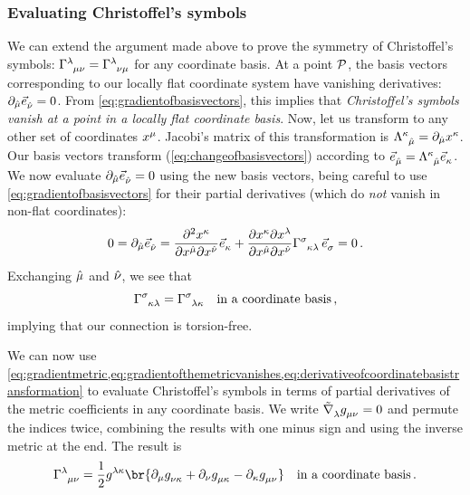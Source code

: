\subsubsection{Evaluating Christoffel's symbols}
%
 We can extend the argument made above to prove the symmetry of Christoffel's symbols: $\tchris\lambda\mu\nu=\tchris\lambda\nu\mu$ for any coordinate basis. At a point $\mathcal{P}$, the basis vectors corresponding to our locally flat coordinate system have vanishing derivatives: $\ipd{\ridx\mu}\tbvec{\ridx\nu} = 0$. From \cref{eq:gradientofbasisvectors}, this implies that \emph{Christoffel's symbols vanish at a point in a locally flat coordinate basis}. Now, let us transform to any other set of coordinates $\tvec\pos\mu$. Jacobi's matrix of this transformation is $\ttransmat{\kappa}{\ridx\mu} = \ipd{\ridx\mu}\tvec\pos\kappa$. Our basis vectors transform (\cref{eq:changeofbasisvectors}) according to $\tbvec{\ridx\mu} = \ttransmat\kappa{\ridx\mu}\tbvec\kappa$. We now evaluate $\ipd{\ridx\mu}\tbvec{\ridx\nu} = 0$ using the new basis vectors, being careful to use \cref{eq:gradientofbasisvectors} for their partial derivatives (which do \emph{not} vanish in non-flat coordinates):
%
\begin{equation}\label{eq:derivativeofcoordinatebasistransformation}
  0 = \ipd{\ridx\mu}\tbvec{\ridx\nu}
    = \dfrac{\partial^2\tvec\pos\kappa}{\partial\tvec\pos{\ridx\mu}\partial\tvec\pos{\ridx\nu}}\tbvec\kappa
      + \dfrac{\partial\tvec\pos\kappa\partial\tvec\pos\lambda}{\partial\tvec\pos{\ridx\mu}\partial\tvec\pos{\ridx\nu}}\tchris\sigma\kappa\lambda\,\tbvec\sigma 
    = 0\,.
\end{equation}
%
Exchanging $\hat{\mu}$ and $\hat{\nu}$, we see that
%
\begin{equation}\label{eq:connectionistorsionfree}
  \tchris\sigma\kappa\lambda = \tchris\sigma\lambda\kappa\quad\text{in a coordinate basis}\,,
\end{equation}
%
implying that our connection is torsion-free.

 We can now use \cref{eq:gradientmetric,eq:gradientofthemetricvanishes,eq:derivativeofcoordinatebasistransformation} to evaluate Christoffel's symbols in terms of partial derivatives of the metric coefficients in any coordinate basis. We write $\tgradcov\lambda\tmetric\mu\nu = 0$ and permute the indices twice, combining the results with one minus sign and using the inverse metric at the end. The result is
%
\begin{equation}\label{eq:christoffelsymbolsasfunctionsofmetric}
  \tchris\lambda\mu\nu = \dfrac 12\tinvmet\lambda\kappa
                            \br{\ipd\mu\tmetric\nu\kappa 
                              + \ipd\nu\tmetric\mu\kappa 
                              - \ipd\kappa\tmetric\mu\nu}\quad\text{in a coordinate basis}\,.
\end{equation}

